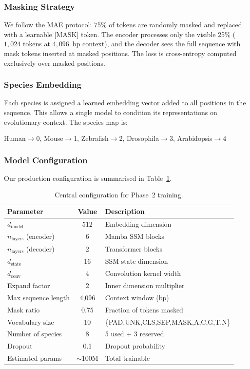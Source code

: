 \documentclass[11pt,a4paper,twoside]{article}
\begin{document}
\subsubsection*{Masking Strategy}

We follow the MAE protocol: 75\% of tokens are randomly masked and replaced with
a learnable [MASK] token. The encoder processes only the visible 25\%
($1,\!024$ tokens at $4,\!096$~bp context), and the decoder sees the full
sequence with mask tokens inserted at masked positions. The loss is
cross-entropy computed exclusively over masked positions.

\subsubsection*{Species Embedding}

Each species is assigned a learned embedding vector added to all positions in
the sequence. This allows a single model to condition its representations on
evolutionary context. The species map is:
\begin{center}
\small
{Human$\to$0, Mouse$\to$1, Zebrafish$\to$2, Drosophila$\to$3,
Arabidopsis$\to$4}
\end{center}

\subsubsection*{Model Configuration}

Our production configuration is summarised in Table~\ref{tab:config}.

\begin{table}[H]
\centering
\caption{Central configuration for Phase~2 training.}
\label{tab:config}
\small
\begin{tabular}{lcl}
\toprule
\textbf{Parameter} & \textbf{Value} & \textbf{Description} \\
\midrule
$d_{\text{model}}$ & 512 & Embedding dimension \\
$n_{\text{layers}}$ (encoder) & 6 & Mamba SSM blocks \\
$n_{\text{layers}}$ (decoder) & 2 & Transformer blocks \\
$d_{\text{state}}$ & 16 & SSM state dimension \\
$d_{\text{conv}}$ & 4 & Convolution kernel width \\
Expand factor & 2 & Inner dimension multiplier \\
Max sequence length & 4,096 & Context window (bp) \\
Mask ratio & 0.75 & Fraction of tokens masked \\
Vocabulary size & 10 & \{PAD,UNK,CLS,SEP,MASK,A,C,G,T,N\} \\
Number of species & 8 & 5 used + 3 reserved \\
Dropout & 0.1 & Dropout probability \\
Estimated params & $\sim$100M & Total trainable \\
\bottomrule
\end{tabular}
\end{table}
\end{document}
